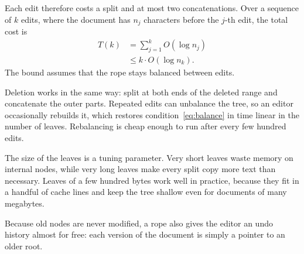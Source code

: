 

Each edit therefore costs a split and at most two concatenations. Over a
sequence of $k$ edits, where the document has $n_j$ characters before the
$j$-th edit, the total cost is
\begin{align}
  T(k) &= \sum_{j=1}^{k} O(\log n_j) \label{eq:cost} \\
       &\le k \cdot O(\log n_k).
\end{align}
The bound assumes that the rope stays balanced between edits.

Deletion works in the same way: split at both ends of the deleted range and
concatenate the outer parts. Repeated edits can unbalance the tree, so an
editor occasionally rebuilds it, which restores condition~\eqref{eq:balance}
in time linear in the number of leaves.
Rebalancing is cheap enough to run after every few hundred edits.

The size of the leaves is a tuning parameter. Very short leaves waste memory
on internal nodes, while very long leaves make every split copy more text
than necessary. Leaves of a few hundred bytes work well in practice, because
they fit in a handful of cache lines and keep the tree shallow even for
documents of many megabytes.

Because old nodes are never modified, a rope also gives the editor an undo
history almost for free: each version of the document is simply a pointer
to an older root.
